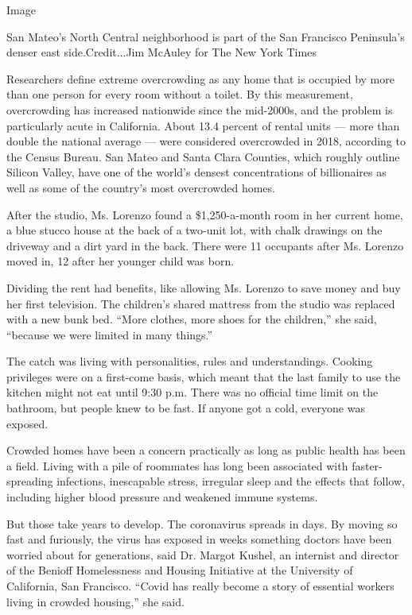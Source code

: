 Image

San Mateo's North Central neighborhood is part of the San Francisco
Peninsula's denser east side.Credit...Jim McAuley for The New York Times

Researchers define extreme overcrowding as any home that is occupied by
more than one person for every room without a toilet. By this
measurement, overcrowding has increased nationwide since the mid-2000s,
and the problem is particularly acute in California. About 13.4 percent
of rental units --- more than double the national average --- were
considered overcrowded in 2018, according to the Census Bureau. San
Mateo and Santa Clara Counties, which roughly outline Silicon Valley,
have one of the world's densest concentrations of billionaires as well
as some of the country's most overcrowded homes.

After the studio, Ms. Lorenzo found a \$1,250-a-month room in her
current home, a blue stucco house at the back of a two-unit lot, with
chalk drawings on the driveway and a dirt yard in the back. There were
11 occupants after Ms. Lorenzo moved in, 12 after her younger child was
born.

Dividing the rent had benefits, like allowing Ms. Lorenzo to save money
and buy her first television. The children's shared mattress from the
studio was replaced with a new bunk bed. ``More clothes, more shoes for
the children,'' she said, ``because we were limited in many things.''

The catch was living with personalities, rules and understandings.
Cooking privileges were on a first-come basis, which meant that the last
family to use the kitchen might not eat until 9:30 p.m. There was no
official time limit on the bathroom, but people knew to be fast. If
anyone got a cold, everyone was exposed.

Crowded homes have been a concern practically as long as public health
has been a field. Living with a pile of roommates has long been
associated with faster-spreading infections, inescapable stress,
irregular sleep and the effects that follow, including higher blood
pressure and weakened immune systems.

But those take years to develop. The coronavirus spreads in days. By
moving so fast and furiously, the virus has exposed in weeks something
doctors have been worried about for generations, said Dr. Margot Kushel,
an internist and director of the Benioff Homelessness and Housing
Initiative at the University of California, San Francisco. ``Covid has
really become a story of essential workers living in crowded housing,''
she said.

